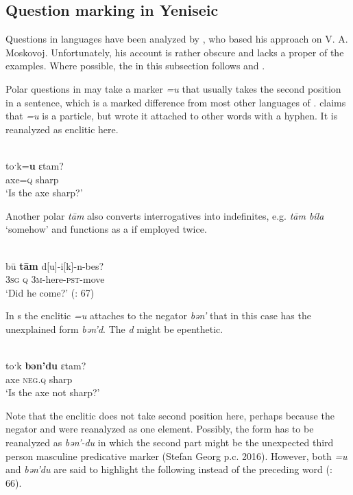 \subsection{Question marking in Yeniseic}\label{sec:5.13.2}

Questions in  languages have been analyzed by \cite[155–168]{Werner1995}, who based his approach on V. A. Moskovoj. Unfortunately, his account is rather obscure and lacks a proper  of the examples. Where possible, the  in this subsection follows \citet{Vajda2004} and \citet{Georg2007}.

Polar questions in  may take a marker \textit{=u} that usually takes the second position in a sentence, which is a marked difference from most other languages of . \citet[159]{Werner1995} claims that \textit{=u} is a particle, but wrote it attached to other words with a hyphen. It is reanalyzed as enclitic here.

\ea%
    \label{ex:yeni:2}
    \\
    \gll toˑk=\textbf{{u}} ɛtam?\\
    axe=\textsc{q}    sharp\\
    \glt ‘Is the axe sharp?’ \citep[159]{Werner1995}
    \z

Another polar  \textit{t\=am} also converts interrogatives into indefinites, e.g. \textit{t\=am bíla} ‘somehow’ and functions as a  if employed twice.

\ea%
    \label{ex:yeni:3}
    \\
    \gll b\=u \textbf{{t\=am}} d[u]-i[k]-n-bes?\\
    3\textsc{sg}  \textsc{q}  3\textsc{m}-here-\textsc{pst}-move\\
    \glt ‘Did he come?’ (\citealt{KotorovaNefedov2015}: 67)
    \z

In s the enclitic \textit{=u} attaches to the negator \textit{bən’} that in this case has the unexplained form \textit{bən’d}. The \textit{d} might be epenthetic.

\ea%
    \label{ex:yeni:4}
    \\
    \gll toˑk \textbf{{bən’du}} ɛtam?\\
    axe  \textsc{neg.q}    sharp\\
    \glt ‘Is the axe not sharp?’ \citep[159]{Werner1995}
    \z

Note that the enclitic does not take second position here, perhaps because the negator and  were reanalyzed as one element. Possibly, the form has to be reanalyzed as \textit{bən’-du} in which the second part might be the unexpected third person  masculine predicative marker (Stefan Georg p.c. 2016). However, both \textit{=u} and \textit{bən’du} are said to highlight the following instead of the preceding word (\citealt{KotorovaNefedov2015}: 66).


